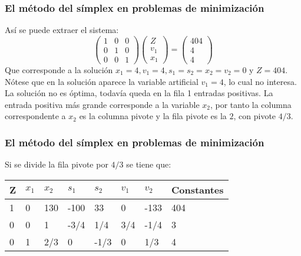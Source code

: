 \documentclass{beamer}
\begin{document}
\begin{frame}
\frametitle{El m\'etodo del s\'implex en problemas de minimizaci\'on}
As\'i se puede extraer el sistema: 
\[\left(
\begin{array}{ccc}
1&0&0 \\ 0&1&0\\ 0&0&1
\end{array}
\right)
\left(
\begin{array}{c}
Z\\v_1\\x_1
\end{array}
\right) = \left(
\begin{array}{c}
404\\ 4\\ 4\end{array}
\right)
\]
Que corresponde a la soluci\'on $x_1 = 4, v_1 = 4, s_1=s_2=x_2=v_2=0$ y $Z=404$. N\'otese que en la soluci\'on aparece la variable artificial $v_1=4$, lo cual no interesa. La soluci\'on no es \'optima, todav\'ia queda en la fila 1 entradas positivas. La entrada positiva m\'as grande corresponde a la variable $x_2$, por tanto la columna correspondente a $x_2$ es la columna pivote y la fila pivote es la $2$, con pivote $4/3$.
\end{frame}





\begin{frame}
\frametitle{El m\'etodo del s\'implex en problemas de minimizaci\'on}
Si se divide la fila pivote por $4/3$ se tiene que:
\begin{tabular}{ |p{0.6cm}||p{0.8cm}|p{0.8cm}|p{0.8cm}|p{0.8cm}|p{0.8cm}|p{0.8cm}|p{1.6cm}|  }
 \hline
 Z & $x_1$ & $x_2$ & $s_1$& $s_2$ & $v_1$  & $v_2$& Constantes \\
 \hline
1 &0 & 130 & -100 & 33& 0& -133 & 404 \\
0 & 0 &  1 & -3/4 & 1/4 & 3/4 & -1/4 & 3 \\
0 & 1 & 2/3 & 0 & -1/3 & 0 & 1/3  & 4 \\
 \hline
\end{tabular}
\end{frame}
\end{document}
